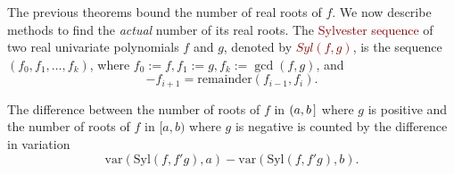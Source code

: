 \documentclass[12pt]{amsart}
\theoremstyle{definition}
\begin{document}

The previous theorems bound the number of real roots of $f$. We now describe methods to find the \textit{actual} number of its real roots. The \textcolor{Maroon}{Sylvester sequence} of two real univariate polynomials $f$ and $g$, denoted by \textcolor{Maroon}{$Syl(f,g)$}, is the sequence $\left(f_{0},f_{1},\dots,f_{k}\right)$, where $f_{0} := f, f_{1} := g, f_{k} := \gcd(f,g)$, and $$-f_{i+1} = \text{remainder}(f_{i-1},f_{i}).$$

\theorem[Sylvester]
The difference between the number of roots of $f$ in $(a,b\hspace{.05cm}]$ where $g$ is positive and the number of roots of $f$ in $[a,b)$ where $g$ is negative is counted by the difference in variation $$\text{var}(\text{Syl}(f,f'g),a) - \text{var}(\text{Syl}(f,f'g),b).$$
\end{document}
